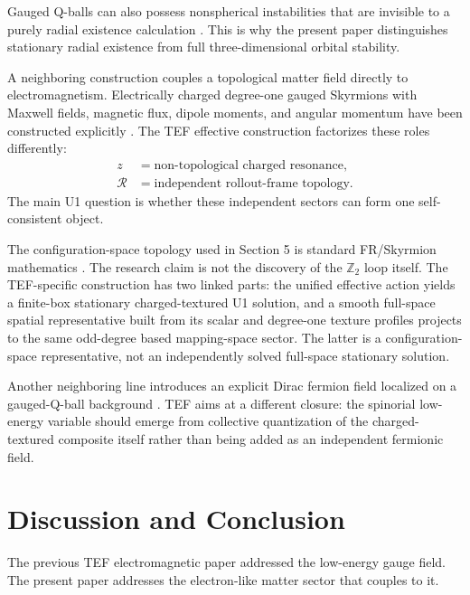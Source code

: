 \documentclass[11pt]{article}
\begin{document}
Gauged Q-balls can also possess nonspherical instabilities that are invisible to a purely radial existence calculation \cite{Rajaraman2025}. This is why the present paper distinguishes stationary radial existence from full three-dimensional orbital stability.

A neighboring construction couples a topological matter field directly to electromagnetism. Electrically charged degree-one gauged Skyrmions with Maxwell fields, magnetic flux, dipole moments, and angular momentum have been constructed explicitly \cite{Livramento2023}. The TEF effective construction factorizes these roles differently:
\begin{equation}
\boxed{
\begin{aligned}
z&=\text{non-topological charged resonance},
\\
\mathcal R&=\text{independent rollout-frame topology}.
\end{aligned}
}
\end{equation}
The main U1 question is whether these independent sectors can form one self-consistent object.

The configuration-space topology used in Section 5 is standard FR/Skyrmion mathematics \cite{Giulini1993,Krusch2003,Krusch2006,CorkHarland2024}. The research claim is not the discovery of the \(\mathbb Z_2\) loop itself. The TEF-specific construction has two linked parts: the unified effective action yields a finite-box stationary charged-textured U1 solution, and a smooth full-space spatial representative built from its scalar and degree-one texture profiles projects to the same odd-degree based mapping-space sector. The latter is a configuration-space representative, not an independently solved full-space stationary solution.

Another neighboring line introduces an explicit Dirac fermion field localized on a gauged-Q-ball background \cite{Dzhunushaliev2025}. TEF aims at a different closure: the spinorial low-energy variable should emerge from collective quantization of the charged-textured composite itself rather than being added as an independent fermionic field.

\section{Discussion and Conclusion}

The previous TEF electromagnetic paper addressed the low-energy gauge field. The present paper addresses the electron-like matter sector that couples to it.
\end{document}
